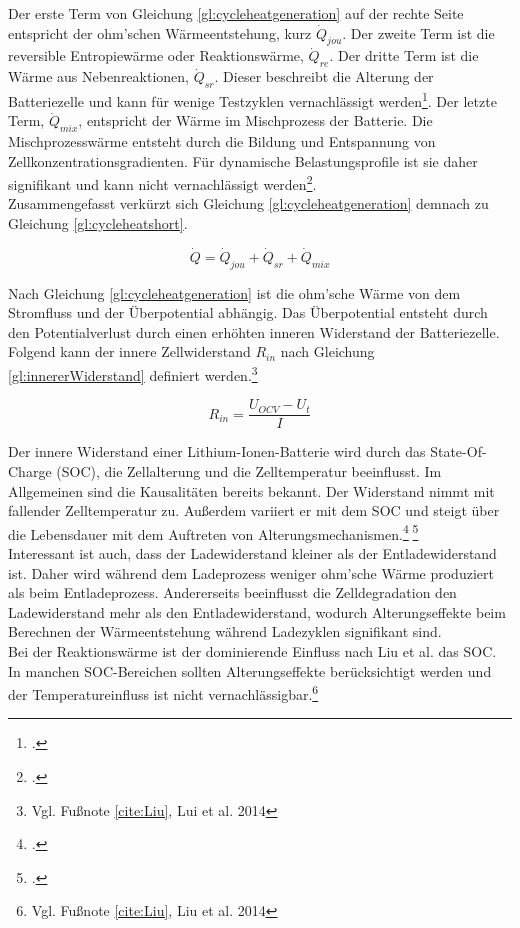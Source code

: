 Der erste Term von Gleichung \ref{gl:cycleheatgeneration} auf der rechte Seite entspricht der ohm'schen Wärmeentstehung, kurz $\dot{Q}_{jou}$. Der zweite Term ist die reversible Entropiewärme oder Reaktionswärme, $\dot{Q}_{re}$. Der dritte Term ist die Wärme aus Nebenreaktionen, $\dot{Q}_{sr}$. Dieser beschreibt die Alterung der Batteriezelle und kann für wenige Testzyklen vernachlässigt werden\footcite[Vgl.][]{Forgez2010}. Der letzte Term, $\dot{Q}_{mix}$, entspricht der Wärme im Mischprozess der Batterie. Die Mischprozesswärme entsteht durch die Bildung und Entspannung von Zellkonzentrationsgradienten. Für dynamische Belastungsprofile ist sie daher signifikant und kann nicht vernachlässigt werden\footcite[Vgl.][]{Thomas2003}. \\
Zusammengefasst verkürzt sich Gleichung \ref{gl:cycleheatgeneration} demnach zu Gleichung \ref{gl:cycleheatshort}.

\begin{equation}\label{gl:cycleheatshort}
	\dot{Q} = \dot{Q}_{jou} + \dot{Q}_{sr} + \dot{Q}_{mix}
\end{equation}

Nach Gleichung \ref{gl:cycleheatgeneration} ist die ohm'sche Wärme von dem Stromfluss und der Überpotential abhängig. Das Überpotential entsteht durch den Potentialverlust durch einen erhöhten inneren Widerstand der Batteriezelle.\\
Folgend kann der innere Zellwiderstand $R_{in}$ nach Gleichung \ref{gl:innererWiderstand} definiert werden.\footnote{Vgl. Fußnote \ref{cite:Liu}, Lui et al. 2014}

\begin{equation}\label{gl:innererWiderstand}
	R_{in} = \frac{U_{OCV} - U_{t}}{I}
\end{equation}

Der innere Widerstand einer Lithium-Ionen-Batterie wird durch das State-Of-Charge (SOC), die Zellalterung und die Zelltemperatur beeinflusst. Im Allgemeinen sind die Kausalitäten bereits bekannt. Der Widerstand nimmt mit fallender Zelltemperatur zu. Außerdem variiert er mit dem SOC und steigt über die Lebensdauer mit dem Auftreten von Alterungsmechanismen.\footcite[Vgl.][]{Andre.2011}$\;$\footcite[Vgl.][]{Ecker.2012}\\
Interessant ist auch, dass der Ladewiderstand kleiner als der Entladewiderstand ist. Daher wird während dem Ladeprozess weniger ohm'sche Wärme produziert als beim Entladeprozess. Andererseits beeinflusst die Zelldegradation den Ladewiderstand mehr als den Entladewiderstand, wodurch Alterungseffekte beim Berechnen der Wärmeentstehung während Ladezyklen signifikant sind.\\
Bei der Reaktionswärme ist der dominierende Einfluss nach Liu et al. das SOC. In manchen SOC-Bereichen sollten Alterungseffekte berücksichtigt werden und der Temperatureinfluss ist nicht vernachlässigbar.\footnote{Vgl. Fußnote \ref{cite:Liu}, Liu et al. 2014}

